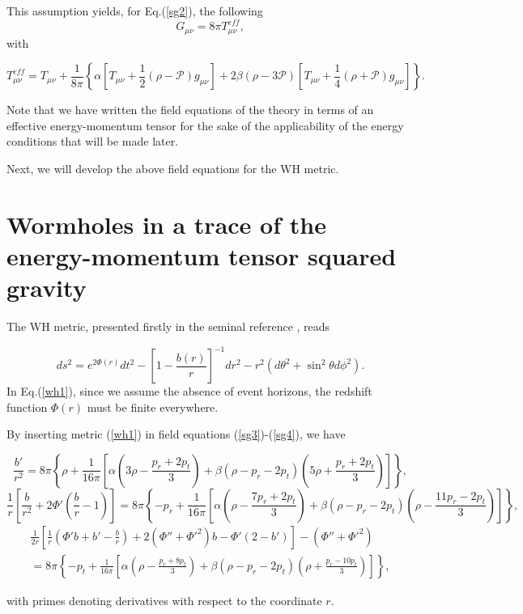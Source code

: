 \documentclass[twocolumn,showpacs,aps,amssymb,floatfix,prd,amsmath,preprintnumbers]{revtex4}
\begin{document}
This assumption yields, for Eq.(\ref{sg2}), the following
\begin{equation}\label{sg3}
G_{\mu\nu}=8\pi T_{\mu\nu}^{eff},
\end{equation}
with 
\begin{widetext}
\begin{equation}\label{sg4}
T_{\mu\nu}^{eff}=T_{\mu\nu}+\frac{1}{8\pi}\left\{\alpha\left[T_{\mu\nu}+\frac{1}{2}(\rho-\mathcal{P})g_{\mu\nu}\right]+2\beta(\rho-3\mathcal{P})\left[T_{\mu\nu}+\frac{1}{4}(\rho+\mathcal{P})g_{\mu\nu}\right]\right\}.
\end{equation}
\end{widetext}

Note that we have written the field equations of the theory in terms of an effective energy-momentum tensor for the sake of the applicability of the energy conditions that will be made later.

Next, we will develop the above field equations for the WH metric.

\section{Wormholes in a trace of the energy-momentum tensor squared gravity}\label{sec:wh}

The WH metric, presented firstly in the seminal reference \cite{morris/1988}, reads

\begin{equation}\label{wh1}
ds^{2}=e^{2\Phi(r)}dt^{2}-\left[1-\frac{b(r)}{r}\right]^{-1}dr^{2}-r^{2}(d\theta^{2}+\sin^{2}\theta d\phi^{2}).
\end{equation}
In Eq.(\ref{wh1}), since we assume the absence of event horizons, the redshift function $\Phi(r)$ must be finite everywhere. 

By inserting metric (\ref{wh1}) in field equations (\ref{sg3})-(\ref{sg4}), we have

\begin{widetext}
\begin{equation}\label{wh3}
\frac{b'}{r^{2}}=8\pi\left\{\rho+\frac{1}{16\pi}\left[\alpha\left(3\rho-\frac{p_r+2p_t}{3}\right)+\beta(\rho-p_r-2p_t)\left(5\rho+\frac{p_r+2p_t}{3}\right)\right]\right\},
\end{equation}
\begin{equation}\label{wh4}
\frac{1}{r}\left[\frac{b}{r^2}+2\Phi'\left(\frac{b}{r}-1\right)\right]=8\pi\left\{-p_r+\frac{1}{16\pi}\left[\alpha\left(\rho-\frac{7p_r+2p_t}{3}\right)+\beta(\rho-p_r-2p_t)\left(\rho-\frac{11p_r-2p_t}{3}\right)\right]\right\},
\end{equation}
\begin{eqnarray}\label{wh5}
\frac{1}{2r}\left[\frac{1}{r}\left(\Phi'b+b'-\frac{b}{r}\right)+2(\Phi''+\Phi'^2)b-\Phi'(2-b')\right]-(\Phi''+\Phi'^2)\nonumber\\ =8\pi\left\{-p_t+\frac{1}{16\pi}\left[\alpha\left(\rho-\frac{p_r+8p_t}{3}\right)+\beta(\rho-p_r-2p_t)\left(\rho+\frac{p_r-10p_t}{3}\right)\right]\right\},
\end{eqnarray}
\end{widetext}
with primes denoting derivatives with respect to the coordinate $r$.
\end{document}
